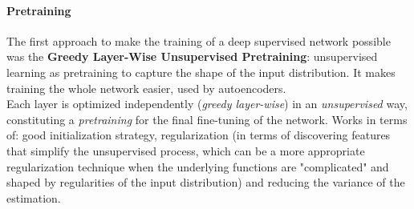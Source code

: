 \documentclass[10pt]{report}
\begin{document}
\paragraph{Pretraining} The first approach to make the training of a deep supervised network possible was the \textbf{Greedy Layer-Wise Unsupervised Pretraining}: unsupervised learning as pretraining to capture the shape of the input distribution. It makes training the whole network easier, used by autoencoders.\\
Each layer is optimized independently (\textit{greedy layer-wise}) in an \textit{unsupervised} way, constituting a \textit{pretraining} for the final fine-tuning of the network. Works in terms of: good initialization strategy, regularization (in terms of discovering features that simplify the unsupervised process, which can be a more appropriate regularization technique when the underlying functions are "complicated" and shaped by regularities of the input distribution) and reducing the variance of the estimation.
\end{document}
